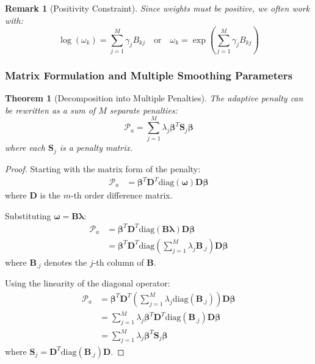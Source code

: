 \documentclass[12pt]{article}
\newtheorem{theorem}{Theorem}
\newtheorem{remark}{Remark}
\begin{document}
\begin{remark}[Positivity Constraint]
Since weights must be positive, we often work with:
\begin{equation}
\log(\omega_k) = \sum_{j=1}^M \gamma_j B_{kj} \quad \text{or} \quad \omega_k = \exp\left(\sum_{j=1}^M \gamma_j B_{kj}\right)
\end{equation}
\end{remark}

\subsubsection{Matrix Formulation and Multiple Smoothing Parameters}

\begin{theorem}[Decomposition into Multiple Penalties]
The adaptive penalty can be rewritten as a sum of $M$ separate penalties:
\begin{equation}
\mathcal{P}_a = \sum_{j=1}^M \lambda_j \boldsymbol{\beta}^T \mathbf{S}_j \boldsymbol{\beta}
\end{equation}
where each $\mathbf{S}_j$ is a penalty matrix.
\end{theorem}

\begin{proof}
Starting with the matrix form of the penalty:
\begin{align}
\mathcal{P}_a &= \boldsymbol{\beta}^T \mathbf{D}^T \text{diag}(\boldsymbol{\omega}) \mathbf{D} \boldsymbol{\beta}
\end{align}
where $\mathbf{D}$ is the $m$-th order difference matrix.

Substituting $\boldsymbol{\omega} = \mathbf{B}\boldsymbol{\lambda}$:
\begin{align}
\mathcal{P}_a &= \boldsymbol{\beta}^T \mathbf{D}^T \text{diag}(\mathbf{B}\boldsymbol{\lambda}) \mathbf{D} \boldsymbol{\beta} \\
&= \boldsymbol{\beta}^T \mathbf{D}^T \text{diag}\left(\sum_{j=1}^M \lambda_j \mathbf{B}_{.j}\right) \mathbf{D} \boldsymbol{\beta}
\end{align}
where $\mathbf{B}_{.j}$ denotes the $j$-th column of $\mathbf{B}$.

Using the linearity of the diagonal operator:
\begin{align}
\mathcal{P}_a &= \boldsymbol{\beta}^T \mathbf{D}^T \left(\sum_{j=1}^M \lambda_j \text{diag}(\mathbf{B}_{.j})\right) \mathbf{D} \boldsymbol{\beta} \\
&= \sum_{j=1}^M \lambda_j \boldsymbol{\beta}^T \mathbf{D}^T \text{diag}(\mathbf{B}_{.j}) \mathbf{D} \boldsymbol{\beta} \\
&= \sum_{j=1}^M \lambda_j \boldsymbol{\beta}^T \mathbf{S}_j \boldsymbol{\beta}
\end{align}
where $\mathbf{S}_j = \mathbf{D}^T \text{diag}(\mathbf{B}_{.j}) \mathbf{D}$.
\end{proof}
\end{document}
